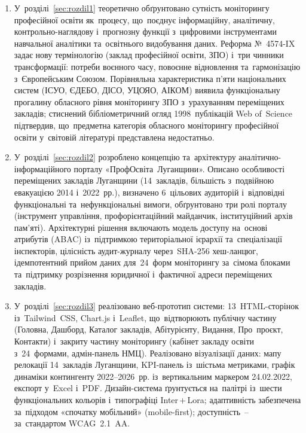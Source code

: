 \begin{enumerate}
    \item У~розділі~\ref{sec:rozdil1} теоретично обґрунтовано сутність моніторингу професійної освіти як~процесу, що~поєднує інформаційну, аналітичну, контрольно-наглядову і~прогнозну функції з~цифровими інструментами навчальної аналітики та~освітнього видобування даних. Реформа №~4574-IX задає нову термінологію (заклад професійної освіти, ЗПО) і~три чинники трансформації: потреби воєнного часу, повоєнне відновлення та~гармонізацію з~Європейським Союзом. Порівняльна характеристика п'яти національних систем (ІСУО, ЄДЕБО, ДІСО, УЦОЯО, АІКОМ) виявила функціональну прогалину обласного рівня моніторингу ЗПО з~урахуванням переміщених закладів; стиснений бібліометричний огляд 1998~публікацій Web of~Science підтвердив, що~предметна категорія обласного моніторингу професійної освіти у~світовій літературі представлена недостатньо.

    \item У~розділі~\ref{sec:rozdil2} розроблено концепцію та~архітектуру аналітично-інформаційного порталу «ПрофОсвіта~Луганщини». Описано особливості переміщених закладів Луганщини (14~закладів, більшість з~подвійною евакуацією 2014 і~2022~рр.), визначено 6~цільових аудиторій і~відповідні функціональні та~нефункціональні вимоги, обґрунтовано три ролі порталу (інструмент управління, профорієнтаційний майданчик, інституційний архів пам'яті). Архітектурні рішення включають модель доступу на~основі атрибутів (ABAC) із~підтримкою територіальної ієрархії та~спеціалізації інспекторів, цілісність аудит-журналу через~SHA-256 хеш-ланцюг, ідемпотентний прийом даних для~24~форм моніторингу за~сімома блоками та~підтримку розрізнення юридичної і~фактичної адреси переміщених закладів.

    \item У~розділі~\ref{sec:rozdil3} реалізовано веб-прототип системи: 13~HTML-сторінок із~Tailwind~CSS, Chart.js і~Leaflet, що~відтворюють публічну частину (Головна, Дашборд, Каталог закладів, Абітурієнту, Видання, Про~проєкт, Контакти) і~закриту частину моніторингу (кабінет закладу освіти з~24~формами, адмін-панель НМЦ). Реалізовано візуалізації даних: мапу релокації 14~закладів Луганщини, KPI-панель із~шістьма метриками, графік динаміки контингенту 2022--2026~рр. із~вертикальним маркером 24.02.2022, експорт у~Excel і~PDF. Дизайн-система ґрунтується на~палітрі із~шести функціональних кольорів і~типографіці Inter\,+\,Lora; адаптивність забезпечена за~підходом «спочатку мобільний» (mobile-first); доступність~-- за~стандартом WCAG~2.1~AA.


\end{enumerate}
